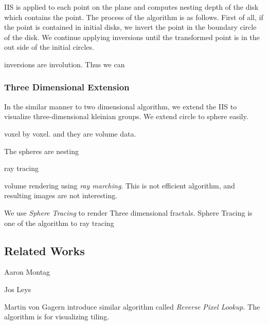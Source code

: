 
IIS is applied to each point on the plane and computes nesting depth of
the disk which contains the point.
The process of the algorithm is as follows.
First of all, if the point is contained in initial disks, we invert the
point in the boundary circle of the disk.
We continue applying inversions until the transformed point is in the
out side of the initial circles.

inversions are involution. Thus we can 

\subsubsection{Three Dimensional Extension}


In the similar manner to two dimensional algorithm,
we extend the IIS to visualize three-dimensional kleinian groups.
We extend circle to sphere easily.

voxel by voxel.
and they are volume data.

The spheres are nesting

ray tracing 

volume rendering using \textit{ray marching}.
This is not efficient algorithm, and resulting images are not interesting.


We use \textit{Sphere Tracing} to render Three dimensional
fractals.
Sphere Tracing is one of the algorithm to ray tracing

\subsection{Related Works}

Aaron Montag

Jos Leys

Martin von Gagern introduce similar algorithm called \textit{Reverse
Pixel Lookup}. The algorithm is for visualizing tiling.